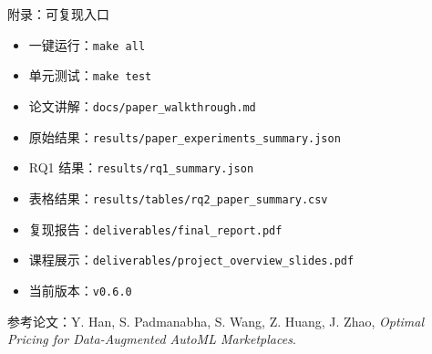 \documentclass[aspectratio=169,10pt]{ctexbeamer}
\begin{document}
\begin{frame}{附录：可复现入口}
\begin{itemize}
  \item 一键运行：\texttt{make all}
  \item 单元测试：\texttt{make test}
  \item 论文讲解：\texttt{docs/paper\_walkthrough.md}
  \item 原始结果：\texttt{results/paper\_experiments\_summary.json}
  \item RQ1 结果：\texttt{results/rq1\_summary.json}
  \item 表格结果：\texttt{results/tables/rq2\_paper\_summary.csv}
  \item 复现报告：\texttt{deliverables/final\_report.pdf}
  \item 课程展示：\texttt{deliverables/project\_overview\_slides.pdf}
  \item 当前版本：\texttt{v0.6.0}
\end{itemize}
\vspace{0.8em}
\small
参考论文：Y. Han, S. Padmanabha, S. Wang, Z. Huang, J. Zhao,
\emph{Optimal Pricing for Data-Augmented AutoML Marketplaces}.
\end{frame}
\end{document}
